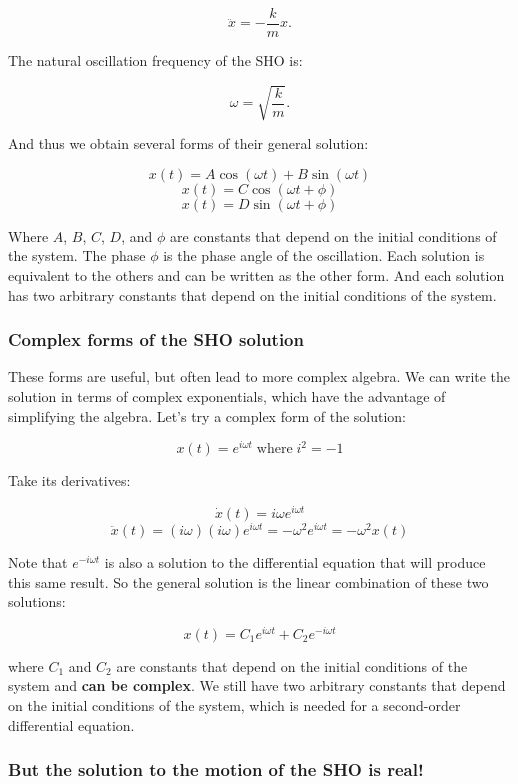 \documentclass[11pt]{article}
\begin{document}
\[\ddot{x} = -\dfrac{k}{m}x.\]

The natural oscillation frequency of the SHO is:

\[\omega = \sqrt{\dfrac{k}{m}}.\]

And thus we obtain several forms of their general solution:

\[x(t) = A\cos(\omega t) + B\sin(\omega t)\]
\[x(t) = C\cos(\omega t + \phi)\] \[x(t) = D\sin(\omega t + \phi)\]

Where \(A\), \(B\), \(C\), \(D\), and \(\phi\) are constants that depend
on the initial conditions of the system. The phase \(\phi\) is the phase
angle of the oscillation. Each solution is equivalent to the others and
can be written as the other form. And each solution has two arbitrary
constants that depend on the initial conditions of the system.

\subsubsection{Complex forms of the SHO
solution}\label{complex-forms-of-the-sho-solution}

These forms are useful, but often lead to more complex algebra. We can
write the solution in terms of complex exponentials, which have the
advantage of simplifying the algebra. Let's try a complex form of the
solution:

\[x(t) = e^{i\omega t}\;\textrm{where}\;i^2=-1\]

Take its derivatives:

\[\dot{x}(t) = i\omega e^{i\omega t}\]
\[\ddot{x}(t) = (i\omega)(i\omega) e^{i\omega t} = -\omega^2 e^{i\omega t} = -\omega^2 x(t)\]

Note that \(e^{-i\omega t}\) is also a solution to the differential
equation that will produce this same result. So the general solution is
the linear combination of these two solutions:

\[x(t) = C_1 e^{i\omega t} + C_2 e^{-i\omega t}\]

where \(C_1\) and \(C_2\) are constants that depend on the initial
conditions of the system and \textbf{can be complex}. We still have two
arbitrary constants that depend on the initial conditions of the system,
which is needed for a second-order differential equation.

\subsubsection{But the solution to the motion of the SHO is
real!}\label{but-the-solution-to-the-motion-of-the-sho-is-real}
\end{document}
